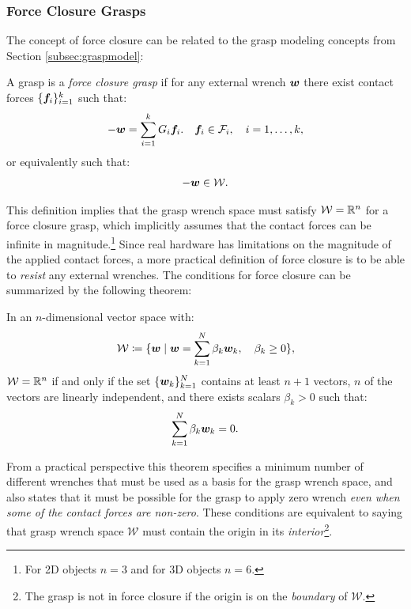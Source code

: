 \subsubsection{Force Closure Grasps}
The concept of force closure can be related to the grasp modeling concepts from Section \ref{subsec:graspmodel}:
\begin{definition} \label{def:forceclosure}
A grasp is a \textit{force closure grasp} if for any external wrench $\bm{w}$ there exist contact forces $\{\bm{f}_i\}_{i=1}^k$ such that:
\begin{equation*}
-\bm{w} = \sum_{i=1}^k G_i \bm{f}_i. \quad \bm{f}_i \in \mathcal{F}_i, \quad i = 1, \dots, k,
\end{equation*}
or equivalently such that:
\begin{equation*}
    -\bm{w} \in \mathcal{W}.
\end{equation*}
\end{definition}
This definition implies that the grasp wrench space must satisfy $\mathcal{W} = \mathbb{R}^n$ for a force closure grasp, which implicitly assumes that the contact forces can be infinite in magnitude.\footnote{For 2D objects $n=3$ and for 3D objects $n=6$.} Since real hardware has limitations on the magnitude of the applied contact forces, a more practical definition of force closure is to be able to \textit{resist} any external wrenches.
The conditions for force closure can be summarized by the following theorem:
\begin{theorem}[] \label{thm:vectorclosure}
In an $n$-dimensional vector space with:
\begin{equation*}
\mathcal{W} \coloneqq \{\bm{w} \mid \bm{w} = \sum_{k=1}^{N} \beta_k \bm{w}_k, \quad \beta_k \geq 0\},
\end{equation*}
$\mathcal{W} = \mathbb{R}^n$ if and only if the set $\{\bm{w}_k\}_{k=1}^N$ contains at least $n+1$ vectors, $n$ of the vectors are linearly independent, and there exists scalars $\beta_k > 0$ such that:
\begin{equation*}
\sum_{k=1}^{N} \beta_k \bm{w}_k = 0.
\end{equation*}
\end{theorem}
From a practical perspective this theorem specifies a minimum number of different wrenches that must be used as a basis for the grasp wrench space, and also states that it must be possible for the grasp to apply zero wrench \textit{even when some of the contact forces are non-zero}. These conditions are equivalent to saying that grasp wrench space $\mathcal{W}$ must contain the origin in its \textit{interior}\footnote{The grasp is not in force closure if the origin is on the \textit{boundary} of $\mathcal{W}$.}. 

